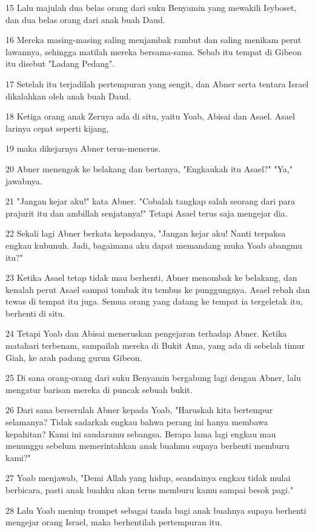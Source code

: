 \par 15 Lalu majulah dua belas orang dari suku Benyamin yang mewakili Isyboset, dan dua belas orang dari anak buah Daud.
\par 16 Mereka masing-masing saling menjambak rambut dan saling menikam perut lawannya, sehingga matilah mereka bersama-sama. Sebab itu tempat di Gibeon itu disebut "Ladang Pedang".
\par 17 Setelah itu terjadilah pertempuran yang sengit, dan Abner serta tentara Israel dikalahkan oleh anak buah Daud.
\par 18 Ketiga orang anak Zeruya ada di situ, yaitu Yoab, Abisai dan Asael. Asael larinya cepat seperti kijang,
\par 19 maka dikejarnya Abner terus-menerus.
\par 20 Abner menengok ke belakang dan bertanya, "Engkaukah itu Asael?" "Ya," jawabnya.
\par 21 "Jangan kejar aku!" kata Abner. "Cobalah tangkap salah seorang dari para prajurit itu dan ambillah senjatanya!" Tetapi Asael terus saja mengejar dia.
\par 22 Sekali lagi Abner berkata kepadanya, "Jangan kejar aku! Nanti terpaksa engkau kubunuh. Jadi, bagaimana aku dapat memandang muka Yoab abangmu itu?"
\par 23 Ketika Asael tetap tidak mau berhenti, Abner menombak ke belakang, dan kenalah perut Asael sampai tombak itu tembus ke punggungnya. Asael rebah dan tewas di tempat itu juga. Semua orang yang datang ke tempat ia tergeletak itu, berhenti di situ.
\par 24 Tetapi Yoab dan Abisai meneruskan pengejaran terhadap Abner. Ketika matahari terbenam, sampailah mereka di Bukit Ama, yang ada di sebelah timur Giah, ke arah padang gurun Gibeon.
\par 25 Di sana orang-orang dari suku Benyamin bergabung lagi dengan Abner, lalu mengatur barisan mereka di puncak sebuah bukit.
\par 26 Dari sana berserulah Abner kepada Yoab, "Haruskah kita bertempur selamanya? Tidak sadarkah engkau bahwa perang ini hanya membawa kepahitan? Kami ini saudaramu sebangsa. Berapa lama lagi engkau mau menunggu sebelum memerintahkan anak buahmu supaya berhenti memburu kami?"
\par 27 Yoab menjawab, "Demi Allah yang hidup, seandainya engkau tidak mulai berbicara, pasti anak buahku akan terus memburu kamu sampai besok pagi."
\par 28 Lalu Yoab meniup trompet sebagai tanda bagi anak buahnya supaya berhenti mengejar orang Israel, maka berhentilah pertempuran itu.
